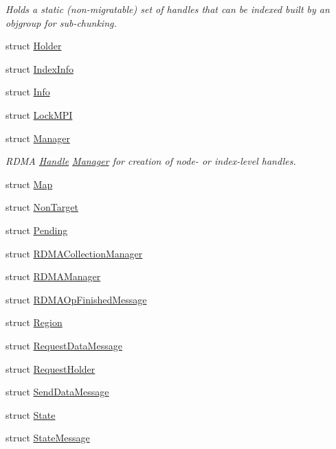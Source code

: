 \begin{DoxyCompactItemize}
\begin{DoxyCompactList}\small\item\em Holds a static (non-\/migratable) set of handles that can be indexed built by an objgroup for sub-\/chunking. \end{DoxyCompactList}\item 
struct \hyperlink{structvt_1_1rdma_1_1_holder}{Holder}
\item 
struct \hyperlink{structvt_1_1rdma_1_1_index_info}{Index\+Info}
\item 
struct \hyperlink{structvt_1_1rdma_1_1_info}{Info}
\item 
struct \hyperlink{structvt_1_1rdma_1_1_lock_m_p_i}{Lock\+M\+PI}
\item 
struct \hyperlink{structvt_1_1rdma_1_1_manager}{Manager}
\begin{DoxyCompactList}\small\item\em R\+D\+MA \hyperlink{structvt_1_1rdma_1_1_handle}{Handle} \hyperlink{structvt_1_1rdma_1_1_manager}{Manager} for creation of node-\/ or index-\/level handles. \end{DoxyCompactList}\item 
struct \hyperlink{structvt_1_1rdma_1_1_map}{Map}
\item 
struct \hyperlink{structvt_1_1rdma_1_1_non_target}{Non\+Target}
\item 
struct \hyperlink{structvt_1_1rdma_1_1_pending}{Pending}
\item 
struct \hyperlink{structvt_1_1rdma_1_1_r_d_m_a_collection_manager}{R\+D\+M\+A\+Collection\+Manager}
\item 
struct \hyperlink{structvt_1_1rdma_1_1_r_d_m_a_manager}{R\+D\+M\+A\+Manager}
\item 
struct \hyperlink{structvt_1_1rdma_1_1_r_d_m_a_op_finished_message}{R\+D\+M\+A\+Op\+Finished\+Message}
\item 
struct \hyperlink{structvt_1_1rdma_1_1_region}{Region}
\item 
struct \hyperlink{structvt_1_1rdma_1_1_request_data_message}{Request\+Data\+Message}
\item 
struct \hyperlink{structvt_1_1rdma_1_1_request_holder}{Request\+Holder}
\item 
struct \hyperlink{structvt_1_1rdma_1_1_send_data_message}{Send\+Data\+Message}
\item 
struct \hyperlink{structvt_1_1rdma_1_1_state}{State}
\item 
struct \hyperlink{structvt_1_1rdma_1_1_state_message}{State\+Message}
\item 

\end{DoxyCompactItemize}
